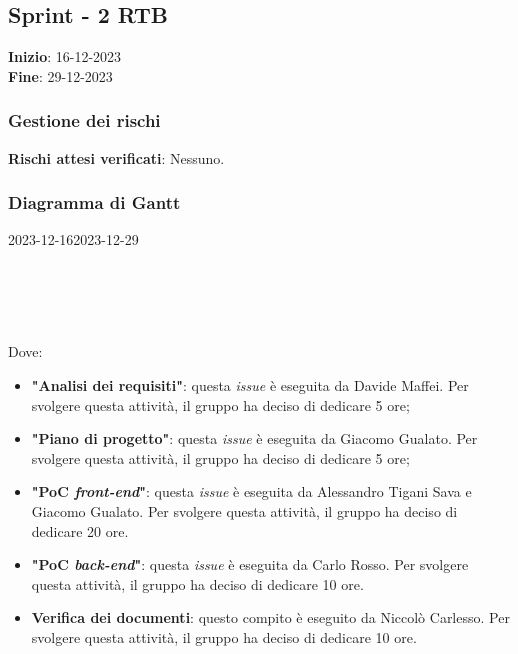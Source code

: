 \subsection{Sprint - 2 RTB}
\textbf{Inizio}: 16-12-2023 \\
\textbf{Fine}: 29-12-2023

\subsubsection{Gestione dei rischi}
\textbf{Rischi attesi verificati}: Nessuno.

\subsubsection{Diagramma di Gantt}

\begin{ganttchart}[
		x unit=0.6cm, %
		y unit chart=0.6cm,
		bar/.style={fill=blue!50},
		bar height=0.5,
		time slot format=isodate,
		time slot unit=day,
		vgrid,
		today=2023-12-16,
		today rule/.style={draw=red, ultra thick}
	]{2023-12-16}{2023-12-29}
	 \\
	 \\
	 \\
	 \\
	 \\
\end{ganttchart}

Dove:
\begin{itemize}
	\item \textbf{"Analisi dei requisiti"}: questa \textit{issue} è eseguita da
	      Davide Maffei. Per svolgere questa attività, il gruppo ha deciso di
	      dedicare 5 ore;

	\item \textbf{"Piano di progetto"}: questa \textit{issue} è eseguita da
	      Giacomo Gualato. Per svolgere questa attività, il gruppo ha deciso
	      di dedicare 5 ore;

	\item \textbf{"PoC \textit{front-end}"}: questa \textit{issue} è eseguita
	      da Alessandro Tigani Sava e Giacomo Gualato. Per svolgere questa
	      attività, il gruppo ha deciso di dedicare 20 ore.

	\item \textbf{"PoC \textit{back-end}"}: questa \textit{issue} è eseguita
	      da Carlo Rosso. Per svolgere questa attività, il gruppo ha deciso di
	      dedicare 10 ore.

	\item \textbf{Verifica dei documenti}: questo compito è eseguito da
	      Niccolò Carlesso. Per svolgere questa attività, il gruppo ha deciso
	      di dedicare 10 ore.
\end{itemize}

